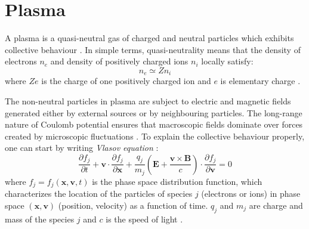 \chapter{Plasma}
A plasma is a quasi-neutral gas of charged and neutral particles which exhibits collective behaviour \cite{plasma-intro3}. In simple terms, quasi-neutrality means that the density of electrons $n_e$ and density of positively charged ions $n_i$ locally satisfy:
\begin{equation}
	n_e \simeq Zn_i
\end{equation}
\noindent where $Ze$ is the charge of one positively charged ion and $e$ is elementary charge \cite{plasma-intro}. 

The non-neutral particles in plasma are subject to electric and magnetic fields generated either by external sources or by neighbouring particles. The long-range nature of Coulomb potential ensures that macroscopic fields dominate over forces created by microscopic fluctuations \cite{plasma-intro}. To explain the collective behaviour properly, one can start by writing \textit{Vlasov equation} \cite{laser-plasma4}:
\begin{equation}
	\frac{\partial f_j}{\partial t} + \bm{v} \cdot \frac{\partial f_j}{\partial \bm{x}} + \frac{q_j}{m_j}\left(\bm{E} + \frac{\bm{v}\times\bm{B}}{c}\right)\cdot \frac{\partial f_j}{\partial \bm{v}} = 0
\end{equation}
\noindent where $f_j = f_j\left(\bm{x},\bm{v},t\right)$ is the phase space distribution function, which characterizes the location of the particles of species $j$ (electrons or ions) in phase space $\left(\bm{x},\bm{v}\right)$ (position, velocity) as a function of time. $q_j$ and $m_j$ are charge and mass of the species $j$ and $c$ is the speed of light \cite{laser-plasma4}.


